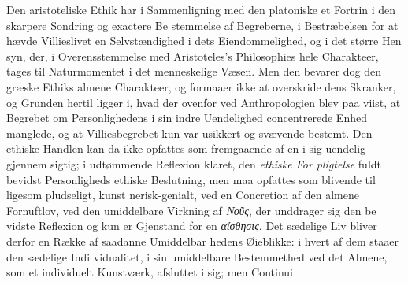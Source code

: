 \documentclass[12pt,a4paper]{book}
\newcommand{\gk}[1]{\textit{#1}}
\begin{document}
Den aristoteliske Ethik har i Sammenligning med den
platoniske et Fortrin i den skarpere Sondring og exactere Be\-%
stemmelse af Begreberne, i Bestræbelsen for at hævde Villieslivet
en Selvstændighed i dets Eiendommelighed, og i det større Hen\-%
syn, der, i Overensstemmelse med Aristoteles's Philosophies hele
Charakteer, tages til Naturmomentet i det menneskelige Væsen.
Men den bevarer dog den græske Ethiks almene Charakteer,
og formaaer ikke at overskride dens Skranker, og Grunden
hertil ligger i, hvad der ovenfor ved Anthropologien blev paa\-%
viist, at Begrebet om Personlighedens i sin indre Uendelighed
concentrerede Enhed manglede, og at Villiesbegrebet kun var
usikkert og svævende bestemt. Den ethiske Handlen kan da
ikke opfattes som fremgaaende af en i sig uendelig gjennem\-%
sigtig; i udtømmende Reflexion klaret, den \emph{ethiske For\-%
pligtelse} fuldt bevidst Personligheds ethiske Beslutning,
men maa opfattes som blivende til ligesom pludseligt, kunst\-%
nerisk-genialt, ved en Concretion af den almene Fornuftlov, ved
den umiddelbare Virkning af \gk{Νοῦς}, der unddrager sig den be\-%
vidste Reflexion og kun er Gjenstand for en \gk{αἴσθησις}. Det
sædelige Liv bliver derfor en Række af saadanne Umiddelbar\-%
hedens Øieblikke: i hvert af dem staaer den sædelige Indi\-%
vidualitet, i sin umiddelbare Bestemmethed ved det Almene,
som et individuelt Kunstværk, afsluttet i sig; men Continui\-%
\end{document}
